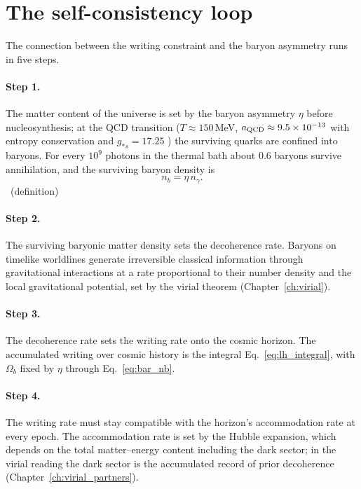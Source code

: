 \section{The self-consistency loop}\label{sec:bar_loop}
The connection between the writing constraint and the baryon asymmetry runs in five steps.

\paragraph{Step 1.} The matter content of the universe is set by the baryon asymmetry $\eta$ before nucleosynthesis; at the QCD
transition ($T\approx150$\,MeV, $a_{\rm QCD}\approx9.5\times10^{-13}$ with entropy conservation and $g_{*s}=17.25$ \calc) the surviving
quarks are confined into baryons. For every $10^{9}$ photons in the thermal bath about $0.6$ baryons survive annihilation, and the
surviving baryon density is
\begin{equation}n_b=\eta\,n_\gamma .\label{eq:bar_nb}\end{equation}
\derived\ (definition)

\paragraph{Step 2.} The surviving baryonic matter density sets the decoherence rate. Baryons on timelike worldlines generate
irreversible classical information through gravitational interactions at a rate proportional to their number density and the local
gravitational potential, set by the virial theorem (Chapter~\ref{ch:virial}). \conjecture

\paragraph{Step 3.} The decoherence rate sets the writing rate onto the cosmic horizon. The accumulated writing over cosmic history is
the integral Eq.~\eqref{eq:lh_integral}, with $\Omega_b$ fixed by $\eta$ through Eq.~\eqref{eq:bar_nb}. \conjecture

\paragraph{Step 4.} The writing rate must stay compatible with the horizon's accommodation rate at every epoch. The accommodation rate is
set by the Hubble expansion, which depends on the total matter--energy content including the dark sector; in the virial reading the
dark sector is the accumulated record of prior decoherence (Chapter~\ref{ch:virial_partners}). \conjecture

